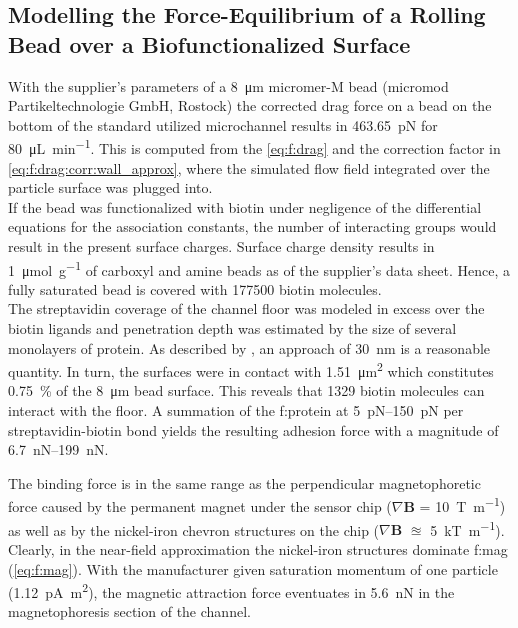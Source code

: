 \subsection{Modelling the Force-Equilibrium of a Rolling Bead over a Biofunctionalized Surface}
\label{sec:res:forcesim}
With the supplier's parameters of a \SI{8}{\micro\meter} micromer-M bead (micromod Partikeltechnologie GmbH, Rostock) the corrected drag force on a bead on the bottom of the standard utilized microchannel results in \SI{463.65}{\pico\newton} for \SI{80}{\micro\liter\per\minute}. This is computed from the \cref{eq:f:drag} and the correction factor in \cref{eq:f:drag:corr:wall_approx}, where the simulated flow field integrated over the particle surface was plugged into.\\
If the bead was functionalized with biotin under negligence of the differential equations for the association constants, the number of interacting groups would result in the present surface charges. Surface charge density results in \SI{1}{\micro\mole\per\gram} of \gls{carboxyl} and \gls{amine} beads as of the supplier's data sheet. Hence, a fully saturated bead is covered with \num{177500} biotin molecules.\\
The streptavidin coverage of the channel floor was modeled in excess over the biotin ligands and penetration depth was estimated by the size of several monolayers of protein. As described by \citet{lit:fluidic:ModelMIT}, an approach of \SI{30}{\nano\meter} is a reasonable quantity. In turn, the surfaces were in contact with \SI{1.51}{\micro\meter\squared} which constitutes \SI{0.75}{\percent} of the \SI{8}{\micro\meter} bead surface. This reveals that \num{1329} biotin molecules can interact with the floor. A summation of the \gls{f:protein} at \SIrange{5}{150}{\pico\newton} per streptavidin-biotin bond yields the resulting adhesion force with a magnitude of \SIrange{6.7}{199}{\nano\newton}.\cite{lit:bio:biotin:rupture} 

The binding force is in the same range as the perpendicular magnetophoretic force caused by the permanent magnet under the sensor chip ($\nabla \mathbf{B}$ = \SI{10}{\tesla\per\meter}) as well as by the nickel-iron chevron structures on the chip ($\nabla \mathbf{B}$ $\approxeq$ \SI{5}{\kilo\tesla\per\meter}). Clearly, in the near-field approximation the nickel-iron structures dominate \gls{f:mag} (\cref{eq:f:mag}). With the manufacturer given saturation momentum of one particle (\SI{1.12}{\pico\ampere\meter\squared}), the magnetic attraction force eventuates in \SI{5.6}{\nano\newton} in the magnetophoresis section of the channel.

